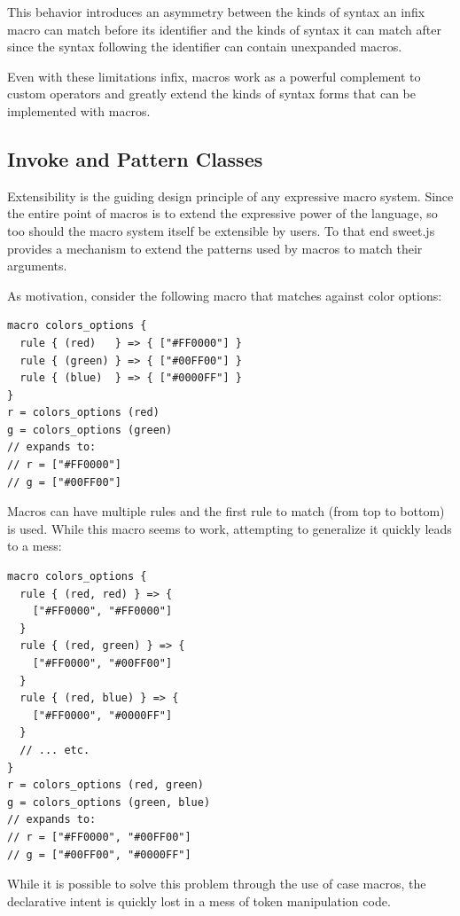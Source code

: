 \documentclass[preprint,10pt]{sigplanconf}
\begin{document}
This behavior introduces an asymmetry between the kinds of syntax an
infix macro can match before its identifier and the kinds of syntax it
can match after since the syntax following the identifier can contain
unexpanded macros.

Even with these limitations infix, macros work as a powerful complement
to custom operators and greatly extend the kinds of syntax forms
that can be implemented with macros.

\subsection{Invoke and Pattern Classes}
\label{sec:invoke}

Extensibility is the guiding design principle of any expressive macro
system. Since the entire point of macros is to extend the expressive
power of the language, so too should the macro system itself be
extensible by users. To that end sweet.js provides a mechanism to
extend the patterns used by macros to match their arguments.

As motivation, consider the following macro that matches against
color options:
\begin{lstlisting}
macro colors_options {
  rule { (red)   } => { ["#FF0000"] }
  rule { (green) } => { ["#00FF00"] }
  rule { (blue)  } => { ["#0000FF"] }
}
r = colors_options (red)
g = colors_options (green)
// expands to:
// r = ["#FF0000"]
// g = ["#00FF00"]
\end{lstlisting}
Macros can have multiple rules and the first rule to match (from top
to bottom) is used. While this macro seems to work, attempting to
generalize it quickly leads to a mess:
\begin{lstlisting}
macro colors_options {
  rule { (red, red) } => {
    ["#FF0000", "#FF0000"]
  }
  rule { (red, green) } => {
    ["#FF0000", "#00FF00"]
  }
  rule { (red, blue) } => {
    ["#FF0000", "#0000FF"]
  }
  // ... etc.
}
r = colors_options (red, green)
g = colors_options (green, blue)
// expands to:
// r = ["#FF0000", "#00FF00"]
// g = ["#00FF00", "#0000FF"]
\end{lstlisting}
While it is possible to solve this problem through the use of case
macros, the declarative intent is quickly lost in a mess of 
token manipulation code.
\end{document}
